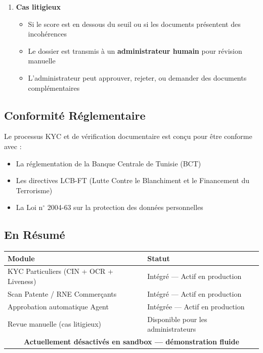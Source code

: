 \documentclass[11pt,a4paper]{article}
\begin{document}
\begin{enumerate}[leftmargin=*]
    \item \textbf{Cas litigieux}
    \begin{itemize}
        \item Si le score est en dessous du seuil ou si les documents pr\'esentent des incoh\'erences
        \item Le dossier est transmis \`a un \textbf{administrateur humain} pour r\'evision manuelle
        \item L'administrateur peut approuver, rejeter, ou demander des documents compl\'ementaires
    \end{itemize}
\end{enumerate}

\subsection{Conformit\'e R\'eglementaire}

Le processus KYC et de v\'erification documentaire est con\c{c}u pour \^etre conforme avec :
\begin{itemize}[leftmargin=*]
    \item La r\'eglementation de la Banque Centrale de Tunisie (BCT)
    \item Les directives LCB-FT (Lutte Contre le Blanchiment et le Financement du Terrorisme)
    \item La Loi n$^\circ$ 2004-63 sur la protection des donn\'ees personnelles
\end{itemize}

\subsection{En R\'esum\'e}

\begin{center}
\begin{tabular}{|p{5cm}|p{7cm}|}
\hline
\textbf{Module} & \textbf{Statut} \\
\hline
KYC Particuliers (CIN + OCR + Liveness) & Int\'egr\'e --- Actif en production \\
Scan Patente / RNE Commer\c{c}ants & Int\'egr\'e --- Actif en production \\
Approbation automatique Agent & Int\'egr\'ee --- Actif en production \\
Revue manuelle (cas litigieux) & Disponible pour les administrateurs \\
\hline
\multicolumn{2}{|c|}{\small\textbf{ Actuellement d\'esactiv\'es en sandbox --- d\'emonstration fluide }} \\
\hline
\end{tabular}
\end{center}
\end{document}
